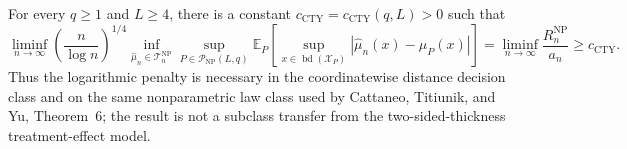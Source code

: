 For every \(q\geq1\) and \(L\geq4\), there is a constant \(c_{\mathrm{CTY}}=c_{\mathrm{CTY}}(q,L)>0\) such that
\[
 \liminf_{n\to\infty}
 \left(\frac{n}{\log n}\right)^{1/4}
 \inf_{\widehat\mu_n\in\mathcal T_n^{\mathrm{NP}}}
 \sup_{P\in\mathcal P_{\mathrm{NP}}(L,q)}
 \mathbb E_P\!\left[
 \sup_{x\in\operatorname{bd}(\mathcal X_P)}
 |\widehat\mu_n(x)-\mu_P(x)|
 \right]
 =\liminf_{n\to\infty}\frac{R_n^{\mathrm{NP}}}{a_n}
 \geq c_{\mathrm{CTY}}.
\]
Thus the logarithmic penalty is necessary in the coordinatewise distance decision class and on the same nonparametric law class used by Cattaneo, Titiunik, and Yu, Theorem~6; the result is not a subclass transfer from the two-sided-thickness treatment-effect model.